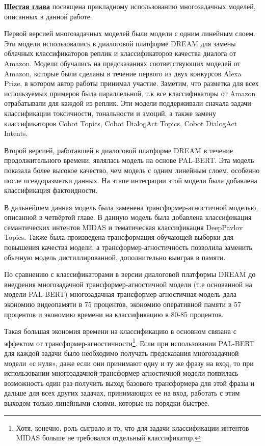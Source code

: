 \underline{\textbf{Шестая глава}} посвящена прикладному использованию многозадачных моделей, описанных в данной работе.

Первой версией многозадачных моделей были модели с одним линейным слоем. Эти модели использовались в диалоговой платформе DREAM для замены облачных классификаторов реплик и классификаторов качества диалога от Amazon. Модели обучались на предсказаниях соответствующих моделей от Amazon, которые были сделаны в течение первого из двух конкурсов Alexa Prize, в котором автор работы принимал участие. Заметим, что разметка для всех используемых примеров была параллельной, т.к все классификаторы от Amazon отрабатывали для каждой из реплик. Эти модели поддерживали сначала задачи классификации токсичности, тональности и эмоций, а также замену классификаторов Cobot Topics, Cobot DialogAct Topics, Cobot DialogAct Intents.

Второй версией, работавшей в диалоговой платформе DREAM в течение продолжительного времени, являлась модель на основе PAL-BERT. Эта модель показала более высокое качество, чем модель с одним линейным слоем, особенно после псевдоразметки данных. На этапе интеграции этой модели была добавлена классификация фактоидности.

В дальнейшем данная модель была заменена трансформер-агностичной моделью, описанной в четвёртой главе. В данную модель была добавлена классификация семантических интентов MIDAS и тематическая классификация DeepPavlov Topics. Также была произведена трансформация обучающей выборки для повышения качества модели, а трансформер-агностичность позволила заменить обычную модель дистиллированной, дополнительно выиграв в памяти.

По сравнению с классификаторами в версии диалоговой платформы DREAM до внедрения многозадачной трансформер-агностичной модели (т.е основанной на модели PAL-BERT) многозадачная трансформер-агностичная модель дала экономию видеопамяти в 75 процентов, экономию оперативной памяти в 57 процентов и экономию времени на классификацию в 80-85 процентов.
 
Такая большая экономия времени на классификацию в основном связана с эффектом от трансформер-агностичности\footnote{Хотя, конечно, роль сыграло и то, что для задачи классификации интентов MIDAS больше не требовался отдельный классификатор.}. Если при использовании PAL-BERT для каждой задачи было необходимо получать предсказания многозадачной модели «с нуля», даже если они принимают одну и ту же фразу на вход, то при использовании многозадачной трансформер-агностичной модели появилась возможность один раз получить выход базового трансформера для этой фразы и дальше для всех других задачах, принимающих ее на вход, работать с этим выходом только линейными слоями, которые на порядки быстрее. 

